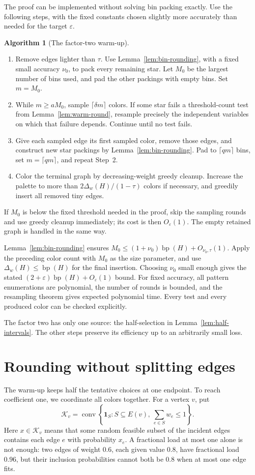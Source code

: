 \documentclass[11pt]{article}
\theoremstyle{definition}\newtheorem{algorithm}{Algorithm}[section]
\numberwithin{equation}{section}
\theoremstyle{remark}\newtheorem*{remark}{Remark}
\newcommand{\one}{\mathbf 1}
\begin{document}
The proof can be implemented without solving bin packing exactly.
Use the following steps, with the fixed constants chosen slightly more
accurately than needed for the target $\varepsilon$.
\begin{algorithm}[The factor-two warm-up]\label{alg:warmup}
\begin{enumerate}
\item Remove edges lighter than $\tau$. Use
Lemma~\ref{lem:bin-rounding}, with a fixed small accuracy $\nu_0$, to
pack every remaining star. Let $M_0$ be the largest number of bins used,
and pad the other packings with empty bins. Set $m=M_0$.
\item While $m\ge aM_0$, sample $\lceil\delta m\rceil$ colors.
If some star fails a threshold-count test from
Lemma~\ref{lem:warm-round}, resample precisely the independent variables
on which that failure depends. Continue until no test fails.
\item Give each sampled edge its first sampled color, remove those
edges, and construct new star packings by
Lemma~\ref{lem:bin-rounding}. Pad to $\lceil qm\rceil$ bins, set
$m=\lceil qm\rceil$, and repeat Step~2.
\item Color the terminal graph by decreasing-weight greedy cleanup.
Increase the palette to more than $2\Delta_w(H)/(1-\tau)$ colors if necessary,
and greedily insert all removed tiny edges.
\end{enumerate}
\end{algorithm}
If $M_0$ is below the fixed threshold needed in the proof, skip the
sampling rounds and use greedy cleanup immediately; its cost is then
$O_\varepsilon(1)$. The empty retained graph is handled in the same way.

Lemma~\ref{lem:bin-rounding} ensures
$M_0\le(1+\nu_0)\operatorname{bp}(H)+O_{\nu_0,\tau}(1)$.
Apply the preceding color count with $M_0$ as the size parameter,
and use $\Delta_w(H)\le\operatorname{bp}(H)$ for the final insertion.
Choosing $\nu_0$ small enough gives the stated
$(2+\varepsilon)\operatorname{bp}(H)+O_\varepsilon(1)$ bound.
For fixed accuracy, all pattern enumerations are polynomial, the number
of rounds is bounded, and the resampling theorem gives expected
polynomial time. Every test and every produced color can be checked
explicitly.

The factor two has only one source: the half-selection in
Lemma~\ref{lem:half-intervals}. The other steps preserve its efficiency
up to an arbitrarily small loss.
\section{Rounding without splitting edges}\label{sec:round-overview}
The warm-up keeps half the tentative choices at one endpoint. To reach
coefficient one, we coordinate all colors together. For a vertex $v$, put
\[
 \mathcal K_v=\operatorname{conv}
 \left\{\one_S:S\subseteq E(v),\ \sum_{e\in S}w_e\le1\right\}.
\]
Here $x\in\mathcal K_v$ means that some random feasible subset of the
incident edges contains each edge $e$ with probability $x_e$.
A fractional load at most one alone is not enough: two edges of weight
$0.6$, each given value $0.8$, have fractional load $0.96$, but their
inclusion probabilities cannot both be $0.8$ when at most one edge fits.
\end{document}
